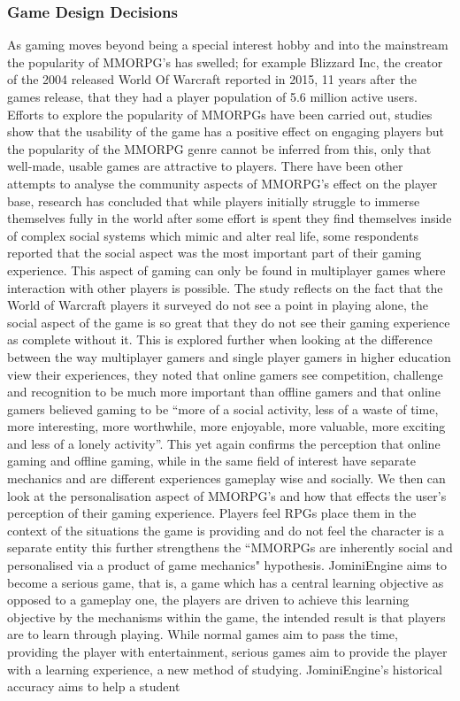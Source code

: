 \documentclass{article}
\begin{document}
	\subsubsection{Game Design Decisions}
	As gaming moves beyond being a special interest hobby and into the mainstream the popularity of MMORPG’s has swelled; for example Blizzard Inc, the creator of the 2004 released World Of Warcraft reported in 2015, 11 years after the games release, that they had a player population of 5.6 million active users. Efforts to explore the popularity of MMORPGs have been carried out\cite{Christou:2012:EPP:2367616.2367630}, studies show that the usability of the game has a positive effect on engaging players but the popularity of the MMORPG genre cannot be inferred from this, only that well-made, usable games are attractive to players. There have been other attempts to analyse the community aspects of MMORPG’s effect on the player base\cite{DoThoseWhoPlay}, research has concluded that while players initially struggle to immerse themselves fully in the world after some effort is spent they find themselves inside of complex social systems which mimic and alter real life, some respondents reported that the social aspect was the most important part of their gaming experience. This aspect of gaming can only be found in multiplayer games where interaction with other players is possible. The study reflects on the fact that the World of Warcraft players it surveyed do not see a point in playing alone, the social aspect of the game is so great that they do not see their gaming experience as complete without it. This is explored further when looking at the\cite{Hainey:2011:DMO:2304793.2305216} difference between the way multiplayer gamers and single player gamers in higher education view their experiences, they noted that online gamers see competition, challenge and recognition to be much more important than offline gamers and that online gamers believed gaming to be “more of a social activity, less of a waste of time, more interesting, more worthwhile, more enjoyable, more valuable, more exciting and less of a lonely activity”. This yet again confirms the perception that online gaming and offline gaming, while in the same field of interest have separate mechanics and are different experiences gameplay wise and socially. We then can look at the personalisation aspect of MMORPG’s and how that effects the user’s perception of their gaming experience. Players feel RPGs place them in the context of the situations the game is providing and do not feel the character is a separate entity\cite{bowman:2012:EPP:2367616.2367630} this further strengthens the “MMORPGs are inherently social and personalised via a product of game mechanics" hypothesis. JominiEngine aims to become a serious game, that is, a game which has a central learning objective as opposed to a gameplay one, the players are driven to achieve this learning objective by the mechanisms within the game, the intended result is that players are to learn through playing. While normal games aim to pass the time, providing the player with entertainment, serious games aim to provide the player with a learning experience, a new method of studying. JominiEngine's historical accuracy aims to help a student 
\end{document}
